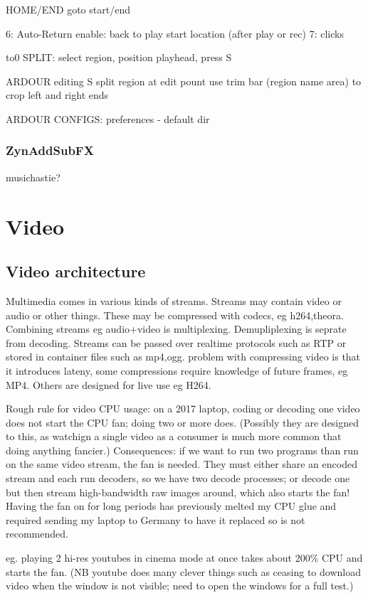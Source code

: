 \documentclass[oneside,english]{scrbook}
\begin{document}
HOME/END goto start/end

6: Auto-Return enable: back to play start location (after play or rec)
7: clicks

to0 SPLIT: select region, position playhead, press S


ARDOUR editing
	S split region at edit pount
	use trim bar (region name area) to crop left and right ends

ARDOUR CONFIGS:
	preferences - default dir

\section{ZynAddSubFX}

musichastie?


\part{Video}


\chapter{Video architecture}

Multimedia comes in various kinds of streams. Streams may contain
video or audio or other things. These may be compressed with codecs,
eg h264,theora. Combining streams eg audio+video is multiplexing.
Demupliplexing is seprate from decoding. Streams can be passed over
realtime protocols such as RTP or stored in container files such as
mp4,ogg. problem with compressing video is that it introduces lateny,
some compressions require knowledge of future frames, eg MP4. Others
are designed for live use eg H264. 

Rough rule for video CPU usage: on a 2017 laptop, coding or decoding one video does not start the CPU fan; doing two or more does. (Possibly they are designed to this, as watchign a single video as a consumer is much more common that doing anything fancier.)  Consequences: if we want to run two programs than run on the same video stream, the fan is needed. They must either share an encoded stream and each run decoders, so we have two decode processes; or decode one but then stream high-bandwidth raw images around, which also starts the fan! Having the fan on for long periods has previously melted my CPU glue and required sending my laptop to Germany to have it replaced so is not recommended.

eg. playing 2 hi-res youtubes in cinema mode at once takes about 200\% CPU and starts the fan. (NB youtube does many clever things such as ceasing to download video when the window is not visible; need to open the windows for a full test.)
\end{document}
